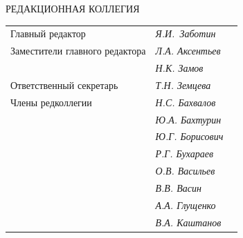 




\pagestyle{empty}





\bigskip


\bigskip


\centerline{\Large РЕДАКЦИОННАЯ КОЛЛЕГИЯ}


\bigskip


\bigskip


\begin{tabular}{p{63mm}p{40mm}p{50mm}}


Главный редактор               &   \it Я.И.~Заботин & \\


Заместители главного редактора &   \it Л.А. Аксентьев  & \\


                               &   \it Н.К. Замов  & \\


Ответственный секретарь        &   \it Т.Н. Земцева & \\[3mm]


Члены редколлегии              &   \it Н.С. Бахвалов & \\


                               &   \it Ю.А. Бахтурин  & \\


                               &   \it Ю.Г. Борисович & \\


                               &   \it Р.Г. Бухараев & \\


                               &   \it О.В. Васильев  & \\


                               &   \it В.В. Васин  & \\


                               &   \it А.А. Глущенко & \\


                               &   \it В.А. Каштанов  & \\



\end{tabular}
